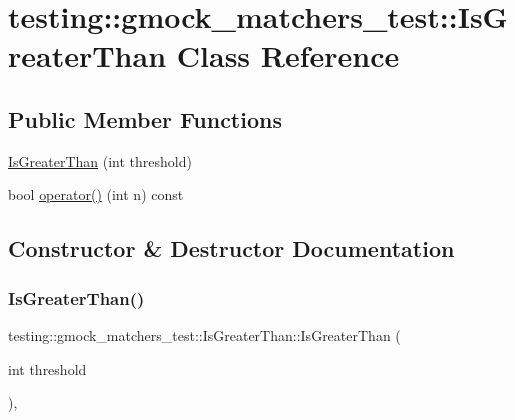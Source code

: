 \hypertarget{classtesting_1_1gmock__matchers__test_1_1IsGreaterThan}{}\section{testing\+::gmock\+\_\+matchers\+\_\+test\+::Is\+Greater\+Than Class Reference}
\label{classtesting_1_1gmock__matchers__test_1_1IsGreaterThan}
\subsection*{Public Member Functions}
\begin{DoxyCompactItemize}
\item 
\mbox{\hyperlink{classtesting_1_1gmock__matchers__test_1_1IsGreaterThan_a6682979fb1ed5511995e575954d07aaf}{Is\+Greater\+Than}} (int threshold)
\item 
bool \mbox{\hyperlink{classtesting_1_1gmock__matchers__test_1_1IsGreaterThan_a34b455148a2d299c654bc4443db0af67}{operator()}} (int n) const
\end{DoxyCompactItemize}


\subsection{Constructor \& Destructor Documentation}
\mbox{\label{classtesting_1_1gmock__matchers__test_1_1IsGreaterThan_a6682979fb1ed5511995e575954d07aaf}} 
\subsubsection{\texorpdfstring{IsGreaterThan()}{IsGreaterThan()}}
{\footnotesize\ttfamily testing\+::gmock\+\_\+matchers\+\_\+test\+::\+Is\+Greater\+Than\+::\+Is\+Greater\+Than (\begin{DoxyParamCaption}\item[{int}]{threshold }\end{DoxyParamCaption})\hspace{0.3cm}{\ttfamily [inline]}, {\ttfamily [explicit]}}



